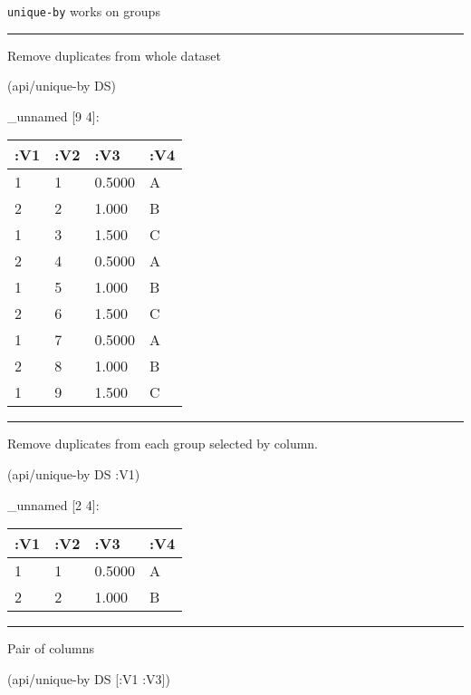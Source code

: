 \documentclass[]{article}
\newenvironment{Shaded}{\begin{snugshade}}{\end{snugshade}}
\newcommand{\AttributeTok}[1]{\textcolor[rgb]{0.77,0.63,0.00}{#1}}
\newcommand{\NormalTok}[1]{#1}
\begin{document}
\texttt{unique-by} works on groups

\begin{center}\rule{0.5\linewidth}{0.5pt}\end{center}

Remove duplicates from whole dataset

\begin{Shaded}
\begin{Highlighting}[]
\NormalTok{(api/unique-by DS)}
\end{Highlighting}
\end{Shaded}

\_unnamed {[}9 4{]}:

\begin{longtable}[]{@{}llll@{}}
\toprule
:V1 & :V2 & :V3 & :V4\tabularnewline
\midrule
\endhead
1 & 1 & 0.5000 & A\tabularnewline
2 & 2 & 1.000 & B\tabularnewline
1 & 3 & 1.500 & C\tabularnewline
2 & 4 & 0.5000 & A\tabularnewline
1 & 5 & 1.000 & B\tabularnewline
2 & 6 & 1.500 & C\tabularnewline
1 & 7 & 0.5000 & A\tabularnewline
2 & 8 & 1.000 & B\tabularnewline
1 & 9 & 1.500 & C\tabularnewline
\bottomrule
\end{longtable}

\begin{center}\rule{0.5\linewidth}{0.5pt}\end{center}

Remove duplicates from each group selected by column.

\begin{Shaded}
\begin{Highlighting}[]
\NormalTok{(api/unique-by DS }\AttributeTok{:V1}\NormalTok{)}
\end{Highlighting}
\end{Shaded}

\_unnamed {[}2 4{]}:

\begin{longtable}[]{@{}llll@{}}
\toprule
:V1 & :V2 & :V3 & :V4\tabularnewline
\midrule
\endhead
1 & 1 & 0.5000 & A\tabularnewline
2 & 2 & 1.000 & B\tabularnewline
\bottomrule
\end{longtable}

\begin{center}\rule{0.5\linewidth}{0.5pt}\end{center}

Pair of columns

\begin{Shaded}
\begin{Highlighting}[]
\NormalTok{(api/unique-by DS [}\AttributeTok{:V1} \AttributeTok{:V3}\NormalTok{])}
\end{Highlighting}
\end{Shaded}
\end{document}
